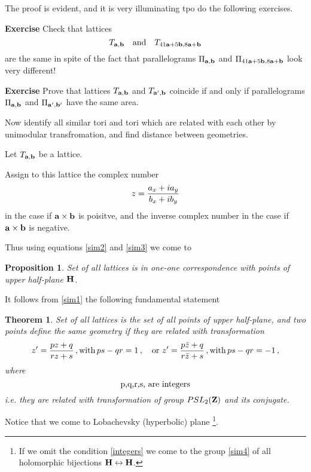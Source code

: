 \documentclass[12pt]{article}
\newtheorem{theorem}{Theorem}
\newtheorem{proposition}{Proposition}
\theoremstyle{definition}
\numberwithin{equation}{section}
\begin{document}
The proof is evident, and it is very illuminating
tpo do the following exercises.

\m

{\bf Exercise}
Check that 
 lattices 
     $$
  T_{{\bf a},{\bf b}} \quad {\rm and}\quad
   T_{41 {\bf a}+5{\bf b}, 8{\bf a}+{\bf b}}
     $$
are the same in spite of the fact that 
parallelograms 
$\Pi_{{\bf a},{\bf b}}$ and
$\Pi_{41 {\bf a}+5{\bf b}, 8{\bf a}+{\bf b}}$
look very different!

\smallskip

{\bf Exercise}
Prove that lattices $T_{{\bf a},{\bf b}}$
and $T_{{\bf a}',{\bf b}}$
coincide if and only if
parallelograms  $\Pi_{{\bf a},{\bf b}}$
and $\Pi_{{\bf a}',{\bf b}'}$
have the same area.

\m

Now identify all similar tori and tori 
which are related
with each other by unimodular transfromation, 
and find distance between geometries.

Let $T_{{\bf a},{\bf b}}$ be a lattice.

Assign to this lattice the  complex number
         $$
z={a_x+ia_y\over b_x+ib_y}
         $$
in the case if ${\bf a}\times {\bf b}$ is poisitve, and
the inverse complex number in the case if
  ${\bf a}\times {\bf b}$ is negative.

Thus using equations \eqref{sim2}
and \eqref{sim3} we come to 

\begin{proposition}  Set of all lattices
is in one-one correspondence with
points of upper half-plane $\bf H$.
\end{proposition}

It follows from \eqref{sim1}
the following fundamental statement

\begin{theorem}
Set of all lattices
is the set of all points of upper half-plane,
and two points define the same geometry
if they are related with transformation 
  \begin{equation}\label{sim4}
   z'={pz+q\over rz+s}\,,{\rm with}\,
      ps-qr=1\,,
   \quad {\rm or}\,\,
   z'={p\bar z+q\over r\bar z+s}\,,{\rm with}\,
      ps-qr=-1\,,
        \end{equation}
where
      \begin{equation}\label{integers}
\hbox{p,q,r,s, are integers}
    \end{equation}
i.e. they are related with transformation
of group $PSL_2({\bf Z})$ and its conjugate. 
\end{theorem}




Notice that we come to Lobachevsky (hyperbolic)
plane \footnote
{If we omit the condition \eqref{integers}
we come to the group \eqref{sim4} 
of all 
holomorphic bijections
${\bf H}\leftrightarrow \bf H$.}.
\end{document}

